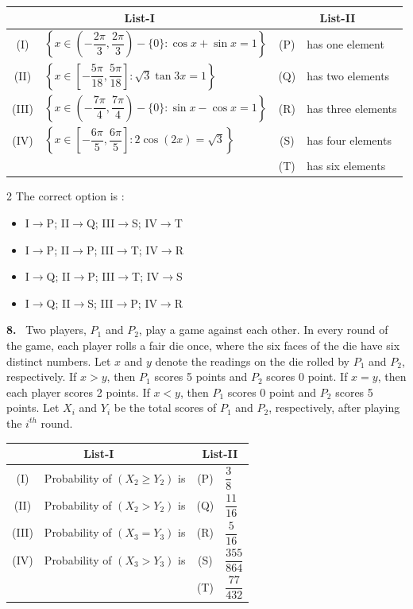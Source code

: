 \documentclass[10pt]{extarticle}
\newcommand{\qn}[1]{\par\smallskip\noindent\textbf{#1.}~}
\newenvironment{qoptions}{\begin{itemize}[leftmargin=1.8em,itemsep=1pt,topsep=2pt,label={}]}{\end{itemize}}
\newcommand{\opt}[2]{\item[(#1)] #2}
\begin{document}
\begin{center}
\begin{tabular}{|c|p{8cm}|c|l|}
\hline
\multicolumn{2}{|c|}{List-I} & \multicolumn{2}{c|}{List-II} \\
\hline
(I) & $\left\{x\in\left(-\dfrac{2\pi}{3},\dfrac{2\pi}{3}\right)-\{0\}:\cos x+\sin x=1\right\}$ & (P) & has one element \\
\hline
(II) & $\left\{x\in\left[-\dfrac{5\pi}{18},\dfrac{5\pi}{18}\right]:\sqrt3\tan3x=1\right\}$ & (Q) & has two elements \\
\hline
(III) & $\left\{x\in\left(-\dfrac{7\pi}{4},\dfrac{7\pi}{4}\right)-\{0\}:\sin x-\cos x=1\right\}$ & (R) & has three elements \\
\hline
(IV) & $\left\{x\in\left[-\dfrac{6\pi}{5},\dfrac{6\pi}{5}\right]:2\cos(2x)=\sqrt3\right\}$ & (S) & has four elements \\
\hline
& & (T) & has six elements \\
\hline
\end{tabular}
\end{center}
\begin{multicols}{2}
The correct option is :
\begin{qoptions}
\opt{A}{I$\to$P; II$\to$Q; III$\to$S; IV$\to$T}
\opt{B}{I$\to$P; II$\to$P; III$\to$T; IV$\to$R}
\opt{C}{I$\to$Q; II$\to$P; III$\to$T; IV$\to$S}
\opt{D}{I$\to$Q; II$\to$S; III$\to$P; IV$\to$R}
\end{qoptions}

\qn{8} Two players, $P_1$ and $P_2$, play a game against each other. In every round of the game, each player rolls a fair die once, where the six faces of the die have six distinct numbers. Let $x$ and $y$ denote the readings on the die rolled by $P_1$ and $P_2$, respectively. If $x>y$, then $P_1$ scores 5 points and $P_2$ scores 0 point. If $x=y$, then each player scores 2 points. If $x<y$, then $P_1$ scores 0 point and $P_2$ scores 5 points. Let $X_i$ and $Y_i$ be the total scores of $P_1$ and $P_2$, respectively, after playing the $i^{th}$ round.
\end{multicols}
\begin{center}
\begin{tabular}{|c|l|c|l|}
\hline
\multicolumn{2}{|c|}{List-I} & \multicolumn{2}{c|}{List-II} \\
\hline
(I) & Probability of $(X_2\ge Y_2)$ is & (P) & $\dfrac38$ \\
\hline
(II) & Probability of $(X_2>Y_2)$ is & (Q) & $\dfrac{11}{16}$ \\
\hline
(III) & Probability of $(X_3=Y_3)$ is & (R) & $\dfrac{5}{16}$ \\
\hline
(IV) & Probability of $(X_3>Y_3)$ is & (S) & $\dfrac{355}{864}$ \\
\hline
& & (T) & $\dfrac{77}{432}$ \\
\hline
\end{tabular}
\end{center}
\end{document}
